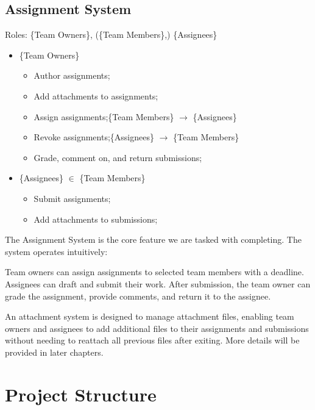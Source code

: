 \documentclass[12pt]{report}
\newcommand{\n}{\par}
\newcommand{\br}{\n\vspace{1 em}\n}
\begin{document}
\subsection{Assignment System} \label{overview.project-objectives.assignment-system}
Roles: \{Team Owners\}, (\{Team Members\},) \{Assignees\}\n
\begin{itemize}
	\item \{Team Owners\}
	      \begin{itemize}
		      \item Author assignments;
		      \item Add attachments to assignments;
		      \item Assign assignments;\null\hfill \{Team Members\} $\rightarrow$ \{Assignees\}
		      \item Revoke assignments;\null\hfill \{Assignees\} $\rightarrow$ \{Team Members\}
		      \item Grade, comment on, and return submissions;
	      \end{itemize}
	\item \{Assignees\} $\in$ \{Team Members\}
	      \begin{itemize}
		      \item Submit assignments;
		      \item Add attachments to submissions;
	      \end{itemize}
\end{itemize}\n
The Assignment System is the core feature we are tasked with completing. The system operates intuitively:\n
Team owners can assign assignments to selected team members with a deadline.
Assignees can draft and submit their work.
After submission, the team owner can grade the assignment, provide comments, and return it to the assignee.
\br
An attachment system is designed to manage attachment files,
enabling team owners and assignees to add additional files to their assignments and submissions without needing to reattach all previous files after exiting.
More details will be provided in later chapters.
\section{Project Structure} \label{overview.project-structure}
\end{document}
